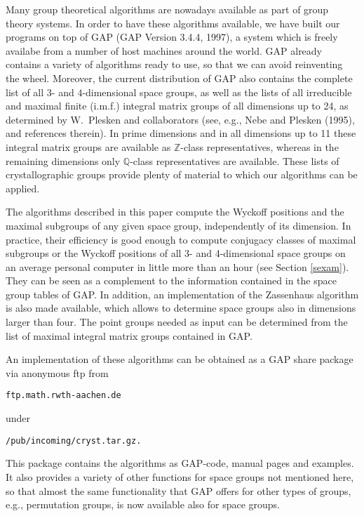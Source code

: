 \documentclass[12pt]{amsart}
\newcommand{\Q}{{\mathbb Q}}
\newcommand{\Z}{{\mathbb Z}}
\newcommand{\GAP}{{\sf GAP}}
\begin{document}
Many group theoretical algorithms are nowadays available as part of
group theory systems. In order to have these algorithms available, we
have built our programs on top of {\GAP} ({\GAP} Version 3.4.4, 1997),
a system which is freely availabe from a number of host machines
around the world. {\GAP} already contains a variety of algorithms
ready to use, so that we can avoid reinventing the wheel.  Moreover,
the current distribution of {\GAP} also contains the complete list of
all $3$- and $4$-dimensional space groups, as well as the lists of all
irreducible and maximal finite (i.m.f.) integral matrix groups of all
dimensions up to 24, as determined by W.~Plesken and collaborators
(see, e.g., Nebe and Plesken (1995), and references therein).
In prime dimensions and in all dimensions up to 11 these integral
matrix groups are available as $\Z$-class representatives, whereas in
the remaining dimensions only $\Q$-class representatives are
available. These lists of crystallographic groups provide plenty of
material to which our algorithms can be applied.

The algorithms described in this paper compute the Wyckoff positions
and the maximal subgroups of any given space group, independently of
its dimension. In practice, their efficiency is good enough to compute
conjugacy classes of maximal subgroups or the Wyckoff positions of all
3- and 4-dimensional space groups on an average personal computer in
little more than an hour (see Section \ref{sexam}). They can be seen
as a complement to the information contained in the space group tables
of {\GAP}. In addition, an implementation of the Zassenhaus algorithm
is also made available, which allows to determine space groups
also in dimensions larger than four. The point groups needed as input
can be determined from the list of maximal integral matrix groups
contained in {\GAP}.

An implementation of these algorithms can be obtained as a {\GAP} 
share package via anonymous ftp from

\centerline{\tt ftp.math.rwth-aachen.de}

\noindent under

\centerline{\tt /pub/incoming/cryst.tar.gz.}

\noindent
This package contains the algorithms as \GAP-code, manual pages and
examples. It also provides a variety of other functions for space
groups not mentioned here, so that almost the same functionality that
{\GAP} offers for other types of groups, e.g., permutation groups, is
now available also for space groups.
\end{document}
